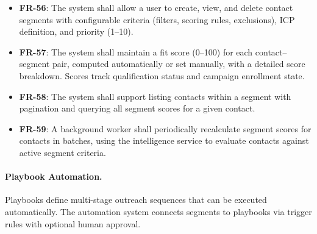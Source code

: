\begin{itemize}
    \item \textbf{FR-56}: The system shall allow a user to create, view, and delete contact segments with configurable criteria (filters, scoring rules, exclusions), ICP definition, and priority (1--10).
    \item \textbf{FR-57}: The system shall maintain a fit score (0--100) for each contact--segment pair, computed automatically or set manually, with a detailed score breakdown. Scores track qualification status and campaign enrollment state.
    \item \textbf{FR-58}: The system shall support listing contacts within a segment with pagination and querying all segment scores for a given contact.
    \item \textbf{FR-59}: A background worker shall periodically recalculate segment scores for contacts in batches, using the intelligence service to evaluate contacts against active segment criteria.
\end{itemize}

\paragraph{Playbook Automation.}
Playbooks define multi-stage outreach sequences that can be executed automatically. The automation system connects segments to playbooks via trigger rules with optional human approval.

